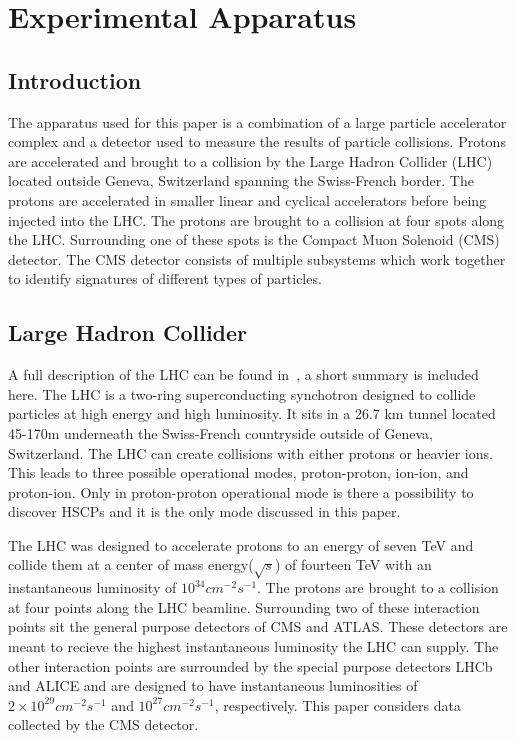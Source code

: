 \chapter{Experimental Apparatus \label{sec:app}}

\section{Introduction}

The apparatus used for this paper is a combination of a large particle accelerator complex and a detector used to measure the results of particle collisions.
Protons are accelerated and brought to a collision by the Large Hadron Collider (LHC)
located outside Geneva, Switzerland spanning the Swiss-French border. The protons are accelerated in smaller linear and cyclical accelerators before being injected
into the LHC. The protons are brought to a collision at four spots along the LHC. Surrounding one of these spots is the Compact Muon Solenoid (CMS) detector. The CMS
detector consists of multiple subsystems which work together to identify signatures of different types of particles.

\section{Large Hadron Collider \label{sec:LHC}}
A full description of the LHC can be found in~\cite{1748-0221-3-08-S08001}, a short summary is included here.
The LHC is a two-ring superconducting synchotron designed
to collide particles at high energy and high luminosity. It sits in a 26.7 km tunnel located 45-170m underneath the Swiss-French countryside outside of Geneva, Switzerland.
The LHC can create collisions with either protons or heavier ions. This leads to three possible operational modes, proton-proton, ion-ion, and proton-ion.
Only in proton-proton operational mode is there a possibility to discover HSCPs and it is the only mode discussed in this paper.

The LHC was designed to accelerate protons to an energy of seven TeV and collide them at a center of mass energy($\sqrt{s}$) of 
fourteen TeV with an instantaneous luminosity of $10^{34}cm^{-2}s^{-1}$. The protons are brought
to a collision at four points along the LHC beamline. Surrounding two of these interaction points sit the general purpose detectors of CMS and ATLAS. These detectors are 
meant to recieve the highest instantaneous luminosity the LHC can supply. The other interaction points are surrounded by the special purpose detectors LHCb and ALICE and
are designed to have instantaneous luminosities of $2\times10^{29}cm^{-2}s^{-1}$ and $10^{27}cm^{-2}s^{-1}$, respectively. This paper considers data collected by the
CMS detector.

